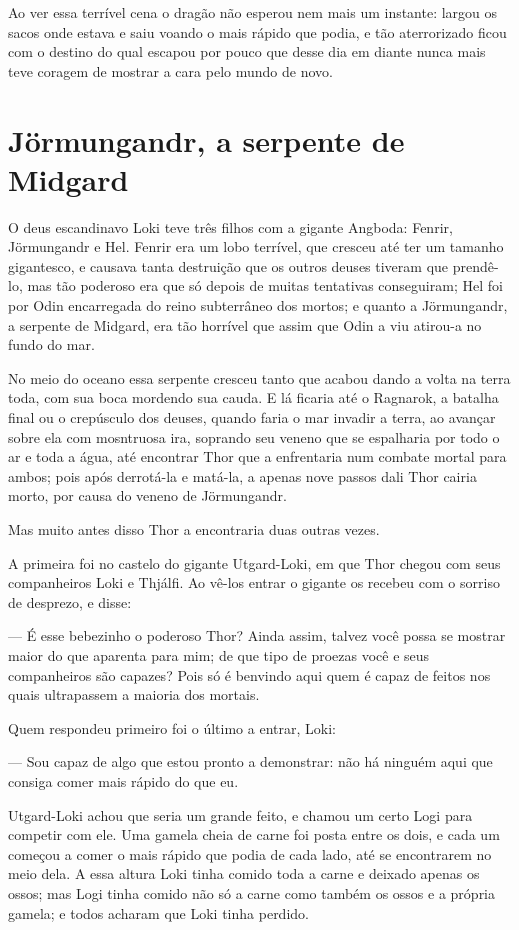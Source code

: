 Ao ver essa terrível cena o dragão não esperou nem mais um instante:
largou os sacos onde estava e saiu voando o mais rápido que podia, e
tão aterrorizado ficou com o destino do qual escapou por pouco que
desse dia em diante nunca mais teve coragem de mostrar a cara pelo
mundo de novo.

\chapter{Jörmungandr, a serpente de Midgard}

O deus escandinavo Loki teve três filhos com a gigante Angboda:
Fenrir, Jörmungandr e Hel. Fenrir era um lobo terrível, que cresceu
até ter um tamanho gigantesco, e causava tanta destruição que os
outros deuses tiveram que prendê-lo, mas tão poderoso era que só
depois de muitas tentativas conseguiram; Hel foi por Odin encarregada
do reino subterrâneo dos mortos; e quanto a Jörmungandr, a serpente
de Midgard, era tão horrível que assim que Odin a viu atirou-a no
fundo do mar. 

No meio do oceano essa serpente cresceu tanto que acabou dando a volta
na terra toda, com sua boca mordendo sua cauda. E lá ficaria até o
Ragnarok, a batalha final ou o crepúsculo dos deuses, quando faria o
mar invadir a terra, ao avançar sobre ela com mosntruosa ira,
soprando seu veneno que se espalharia por todo o ar e toda a água,
até encontrar Thor que a enfrentaria num combate mortal para ambos;
pois após derrotá-la e matá-la, a apenas nove passos dali Thor cairia
morto, por causa do veneno de Jörmungandr.

Mas muito antes disso Thor a encontraria duas outras vezes. 

A primeira foi no castelo do gigante Utgard-Loki, em que Thor chegou
com seus companheiros Loki e Thjálfi. Ao vê-los entrar o gigante os
recebeu com o sorriso de desprezo, e disse:

— É esse bebezinho o poderoso Thor? Ainda assim, talvez você possa se
mostrar maior do que aparenta para mim; de que tipo de proezas você e
seus companheiros são capazes? Pois só é benvindo aqui quem é capaz
de feitos nos quais ultrapassem a maioria dos mortais. 

Quem respondeu primeiro foi o último a entrar, Loki:

— Sou capaz de algo que estou pronto a demonstrar: não há ninguém aqui
que consiga comer mais rápido do que eu. 

Utgard-Loki achou que seria um grande feito, e chamou um certo Logi
para competir com ele. Uma gamela cheia de carne foi posta entre os
dois, e cada um começou a comer o mais rápido que podia de cada lado,
até se encontrarem no meio dela. A essa altura Loki tinha comido toda
a carne e deixado apenas os ossos; mas Logi tinha comido não só a
carne como também os ossos e a própria gamela; e todos acharam que
Loki tinha perdido. 

